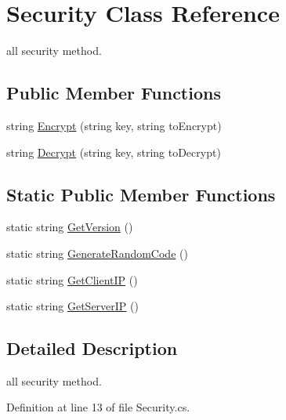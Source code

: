 \hypertarget{class_security}{\section{Security Class Reference}
\label{class_security}
}


all security method.  


\subsection*{Public Member Functions}
\begin{DoxyCompactItemize}
\item 
string \hyperlink{class_security_ad40bee17cc66f6bd636b891e570933c5}{Encrypt} (string key, string to\-Encrypt)
\item 
string \hyperlink{class_security_af503c53b350d8ff929fe71fac9ffab8e}{Decrypt} (string key, string to\-Decrypt)
\end{DoxyCompactItemize}
\subsection*{Static Public Member Functions}
\begin{DoxyCompactItemize}
\item 
static string \hyperlink{class_security_aadc3b8998851e010b4dd62cd46ebcd3c}{Get\-Version} ()
\item 
static string \hyperlink{class_security_a9395e3f676c1921278ed5a587c97ea72}{Generate\-Random\-Code} ()
\item 
static string \hyperlink{class_security_a7ccc2cb5ef5584b8e96fb4519a9e8750}{Get\-Client\-I\-P} ()
\item 
static string \hyperlink{class_security_ae23bcd950667cf41ec9f8ab924ed2ea6}{Get\-Server\-I\-P} ()
\end{DoxyCompactItemize}


\subsection{Detailed Description}
all security method. 

Definition at line 13 of file Security.\-cs.



